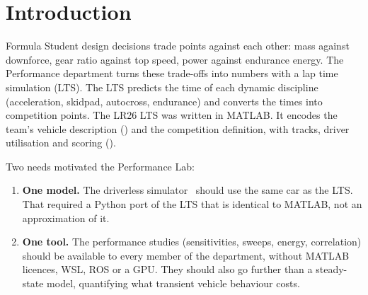 \documentclass[11pt]{article}
\begin{document}
\tableofcontents
\newpage

\section{Introduction}
Formula Student design decisions trade points against each other: mass against downforce, gear ratio against top
speed, power against endurance energy. The Performance department turns these trade-offs into numbers with a lap
time simulation (LTS). The LTS predicts the time of each dynamic discipline (acceleration, skidpad, autocross,
endurance) and converts the times into competition points. The LR26 LTS was written in MATLAB. It encodes the
team's vehicle description () and the competition definition, with tracks, driver
utilisation and scoring ().

Two needs motivated the Performance Lab:
\begin{enumerate}
  \item \textbf{One model.} The driverless simulator~\cite{dvsim} should use the same car as the LTS. That required
        a Python port of the LTS that is identical to MATLAB, not an approximation of it.
  \item \textbf{One tool.} The performance studies (sensitivities, sweeps, energy, correlation) should be available
        to every member of the department, without MATLAB licences, WSL, ROS or a GPU. They should also go
        further than a steady-state model, quantifying what transient vehicle behaviour costs.
\end{enumerate}
\end{document}
